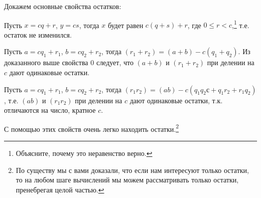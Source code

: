 Докажем основные свойства остатков:


\begin{dok}
Пусть $x = cq + r$, $y  = cs$, тогда $x$ будет равен $c(q + s) + r$, где $0 \leqslant r < c$,\footnote{Объясните, почему это неравенство верно.} т.е. остаток не изменился.
\end{dok}


\begin{dok}
Пусть $a = cq_1 + r_1$, $b = cq_2 + r_2$, тогда $(r_1 + r_2) = (a + b) - c(q_1 + q_2)$. Из доказанного выше свойства $0$ следует, что $(a + b)$ и $(r_1 + r_2)$ при делении на $c$ дают одинаковые остатки. 
\end{dok}


\begin{dok}
Пусть $a = cq_1 + r_1$, $b = cq_2 + r_2$, тогда $(r_1r_2) = (ab) - c(q_1q_2с + q_1r_2 + r_1q_2)$, т.е. $(ab)$ и $(r_1r_2)$ при делении на $c$ дают одинаковые остатки, т.к. отличаются на число, кратное $c$.
\end{dok}

С помощью этих свойств очень легко находить остатки.\footnote{По существу мы с вами доказали, что если нам интересуют только остатки, то на любом шаге вычислений мы можем рассматривать только остатки, пренебрегая целой частью.}


